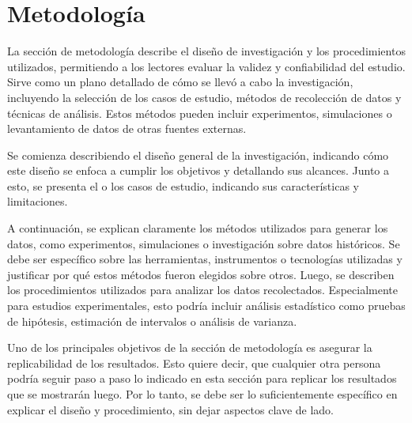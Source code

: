 \section{Metodología}

La sección de metodología describe el diseño de investigación y los procedimientos utilizados, permitiendo a los lectores evaluar la validez y confiabilidad del estudio. Sirve como un plano detallado de cómo se llevó a cabo la investigación, incluyendo la selección de los casos de estudio, métodos de recolección de datos y técnicas de análisis. Estos métodos pueden incluir experimentos, simulaciones o levantamiento de datos de otras fuentes externas.

Se comienza describiendo el diseño general de la investigación, indicando cómo este diseño se enfoca a cumplir los objetivos y detallando sus alcances. Junto a esto, se presenta el o los casos de estudio, indicando sus características y limitaciones.

A continuación, se explican claramente los métodos utilizados para generar los datos, como experimentos, simulaciones o investigación sobre datos históricos. Se debe ser específico sobre las herramientas, instrumentos o tecnologías utilizadas y justificar por qué estos métodos fueron elegidos sobre otros.  Luego, se describen los procedimientos utilizados para analizar los datos recolectados. Especialmente para estudios experimentales, esto podría incluir análisis estadístico como pruebas de hipótesis, estimación de intervalos o análisis de varianza. 

Uno de los principales objetivos de la sección de metodología es asegurar la replicabilidad de los resultados. Esto quiere decir, que cualquier otra persona podría seguir paso a paso lo indicado en esta sección para replicar los resultados que se mostrarán luego. Por lo tanto, se debe ser lo suficientemente específico en explicar el diseño y procedimiento, sin dejar aspectos clave de lado.

